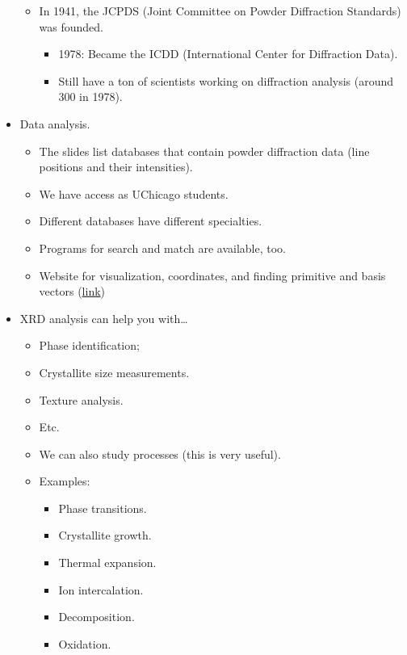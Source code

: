 \documentclass[../notes.tex]{subfiles}
\begin{document}
\begin{itemize}
\begin{itemize}
        \item In 1941, the JCPDS (Joint Committee on Powder Diffraction Standards) was founded.
        \begin{itemize}
            \item 1978: Became the ICDD (International Center for Diffraction Data).
            \item Still have a ton of scientists working on diffraction analysis (around 300 in 1978).
        \end{itemize}
    \end{itemize}
    \item Data analysis.
    \begin{itemize}
        \item The slides list databases that contain powder diffraction data (line positions and their intensities).
        \item We have access as UChicago students.
        \item Different databases have different specialties.
        \item Programs for search and match are available, too.
        \item Website for visualization, coordinates, and finding primitive and basis vectors (\href{https://www.atomic-scale-physics.de/lattice/struk/a4.html}{link})
    \end{itemize}
    \item XRD analysis can help you with\dots
    \begin{itemize}
        \item Phase identification;
        \item Crystallite size measurements.
        \item Texture analysis.
        \item Etc.
        \item We can also study processes (this is very useful).
        \item Examples:
        \begin{itemize}
            \item Phase transitions.
            \item Crystallite growth.
            \item Thermal expansion.
            \item Ion intercalation.
            \item Decomposition.
            \item Oxidation.
            \begin{itemize}

\end{itemize}
\end{itemize}
\end{itemize}
\end{itemize}
\end{document}
